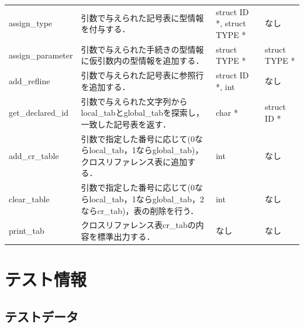 \documentclass{jlreq}
\begin{document}
\begin{table}[H]
{\begin{tabular}{|l|p{6cm}|p{7cm}|p{4cm}|}
      assign\_type      & 引数で与えられた記号表に型情報を付与する．                                                       & struct ID *, struct TYPE *             & なし                          \\
      assign\_parameter & 引数で与えられた手続きの型情報に仮引数内の型情報を追加する．                                     & struct TYPE *                          & struct TYPE *                 \\
      add\_refline      & 引数で与えられた記号表に参照行を追加する．                                                       & struct ID *, int                       & なし                          \\
      get\_declared\_id & 引数で与えられた文字列からlocal\_tabとglobal\_tabを探索し，一致した記号表を返す．                & char *                                 & struct ID *                   \\
      add\_cr\_table    & 引数で指定した番号に応じて(0ならlocal\_tab，1ならglobal\_tab)，クロスリファレンス表に追加する．  & int                                    & なし                          \\
      clear\_table      & 引数で指定した番号に応じて(0ならlocal\_tab，1ならglobal\_tab，2ならcr\_tab)，表の削除を行う．    & int                                    & なし                          \\
      print\_tab        & クロスリファレンス表cr\_tabの内容を標準出力する．                                                & なし                                   & なし                          \\ \hline
    \end{tabular}}
  \label{tab:cross_referencer_func}
\end{table}


\section{テスト情報}
\subsection{テストデータ}
\end{document}
